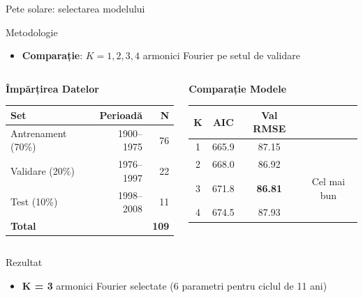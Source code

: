 \documentclass[9pt, aspectratio=169, t]{beamer}
\begin{document}
\begin{frame}{Pete solare: selectarea modelului}
    \vspace{-0.1cm}
    \begin{block}{Metodologie}
        \begin{itemize}\setlength{\itemsep}{0pt}
            \item \textbf{Comparație}: $K = 1, 2, 3, 4$ armonici Fourier pe setul de validare
        \end{itemize}
    \end{block}

    \vspace{0.1cm}

    \begin{columns}[T]
        \begin{center}
        \textbf{Împărțirea Datelor}
        \begin{tabular}{lrr}
            \toprule
            \textbf{Set} & \textbf{Perioadă} & \textbf{N} \\
            \midrule
            Antrenament (70\%) & 1900--1975 & 76 \\
            Validare (20\%) & 1976--1997 & 22 \\
            Test (10\%) & 1998--2008 & 11 \\
            \midrule
            \textbf{Total} & & \textbf{109} \\
            \bottomrule
        \end{tabular}
        \end{center}

        \begin{center}
        \textbf{Comparație Modele}
        \begin{tabular}{cccc}
            \toprule
            \textbf{K} & \textbf{AIC} & \textbf{Val RMSE} & \\
            \midrule
            1 & 665.9 & 87.15 & \\
            2 & 668.0 & 86.92 & \\
            \rowcolor{Forest!20} 3 & 671.8 & \textbf{86.81} & Cel mai bun \\
            4 & 674.5 & 87.93 & \\
            \bottomrule
        \end{tabular}
        \end{center}
    \end{columns}

    \vspace{0.1cm}

    \begin{exampleblock}{Rezultat}
        \begin{itemize}\setlength{\itemsep}{0pt}
            \item \textbf{K = 3} armonici Fourier selectate (6 parametri pentru ciclul de 11 ani)
        \end{itemize}
    \end{exampleblock}
\end{frame}
\end{document}
